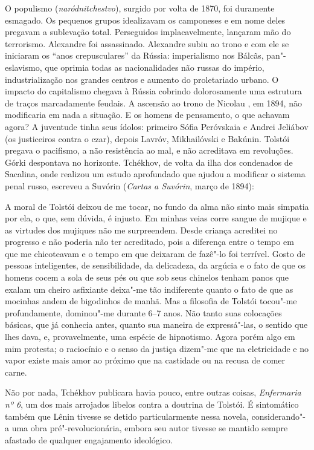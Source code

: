 O populismo (\emph{naródnitchestvo}), surgido por volta de 1870,
foi duramente esmagado. Os pequenos grupos idealizavam os camponeses
e em nome deles pregavam a sublevação total. Perseguidos
implacavelmente, lançaram mão do terrorismo. Alexandre 
foi assassinado. Alexandre  subiu ao trono e com ele
se iniciaram os ``anos crepusculares'' da Rússia: imperialismo nos
Bálcãs, pan"-eslavismo, que oprimia todas as nacionalidades não
russas do império, industrialização nos grandes centros e aumento
do proletariado urbano. O impacto do capitalismo chegava à Rússia
cobrindo dolorosamente uma estrutura de traços marcadamente feudais.
A ascensão ao trono de Nicolau , em 1894, não modificaria
em nada a situação. E os homens de pensamento, o que achavam agora?
A juventude tinha seus ídolos: primeiro Sófia Peróvskaia e Andrei
Jeliábov (os justiceiros contra o czar), depois Lavróv, Mikhailóvski
e Bakúnin. Tolstói pregava o pacifismo, a não resistência ao mal, e
não acreditava em revoluções. Górki despontava no horizonte. Tchékhov,
de volta da ilha dos condenados de Sacalina, onde realizou um
estudo aprofundado que ajudou a modificar o sistema penal russo,
escreveu a Suvórin (\emph{Cartas a Suvórin}, março de 1894): 

A moral de Tolstói deixou de me tocar, no fundo da alma não sinto
mais simpatia por ela, o que, sem dúvida, é injusto. Em minhas
veias corre sangue de mujique e as virtudes dos mujiques não me
surpreendem. Desde criança acreditei no progresso e não poderia
não ter acreditado, pois a diferença entre o tempo em que me
chicoteavam e o tempo em que deixaram de fazê"-lo foi terrível.
Gosto de pessoas inteligentes, de sensibilidade, da delicadeza,
da argúcia e o fato de que os homens cocem a sola de seus pés ou
que sob seus chinelos tenham panos que exalam um cheiro asfixiante
deixa"-me tão indiferente quanto o fato de que as mocinhas andem
de bigodinhos de manhã. Mas a filosofia de Tolstói tocou"-me
profundamente, dominou"-me durante 6--7 anos. Não tanto suas
colocações básicas, que já conhecia antes, quanto sua maneira de
expressá"-las, o sentido que lhes dava, e, provavelmente, uma
espécie de hipnotismo. Agora porém algo em mim protesta; o
raciocínio e o senso da justiça dizem"-me que na eletricidade e
no vapor existe mais amor ao próximo que na castidade ou na recusa
de comer carne. 

Não por nada, Tchékhov publicara havia pouco, entre outras coisas,
\emph{Enfermaria nº 6}, um dos mais arrojados libelos contra a
doutrina de Tolstói. É sintomático também que Lênin tivesse se
detido particularmente nessa novela, considerando"-a uma obra
pré"-revolucionária, embora seu autor tivesse se mantido sempre
afastado de qualquer engajamento ideológico.

